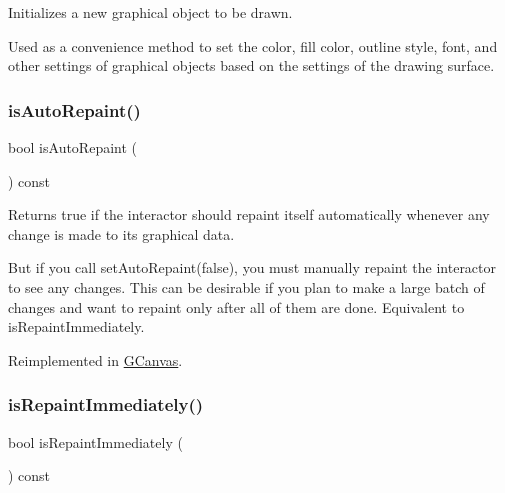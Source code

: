 Initializes a new graphical object to be drawn. 

Used as a convenience method to set the color, fill color, outline style, font, and other settings of graphical objects based on the settings of the drawing surface. \mbox{\label{classGDrawingSurface_a12c8d52ddfcaa5448ec4bace92ddee6c}} 
\subsubsection{\texorpdfstring{is\+Auto\+Repaint()}{isAutoRepaint()}}
{\footnotesize\ttfamily bool is\+Auto\+Repaint (\begin{DoxyParamCaption}{ }\end{DoxyParamCaption}) const\hspace{0.3cm}{\ttfamily [virtual]}}



Returns true if the interactor should repaint itself automatically whenever any change is made to its graphical data. 

But if you call set\+Auto\+Repaint(false), you must manually repaint the interactor to see any changes. This can be desirable if you plan to make a large batch of changes and want to repaint only after all of them are done. Equivalent to is\+Repaint\+Immediately. 

Reimplemented in \mbox{\hyperlink{classGCanvas_a189881032e2b355095790b83b2454d8d}{G\+Canvas}}.

\mbox{\label{classGDrawingSurface_a82a00267c81cc0ae85ee0feb01a92fa8}} 
\subsubsection{\texorpdfstring{is\+Repaint\+Immediately()}{isRepaintImmediately()}}
{\footnotesize\ttfamily bool is\+Repaint\+Immediately (\begin{DoxyParamCaption}{ }\end{DoxyParamCaption}) const\hspace{0.3cm}{\ttfamily [virtual]}}



